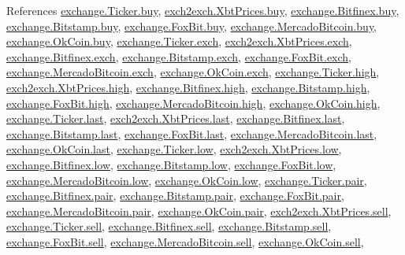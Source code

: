 References \hyperlink{exchange_8py_source_l00058}{exchange.\+Ticker.\+buy}, \hyperlink{exch2exch_8py_source_l00059}{exch2exch.\+Xbt\+Prices.\+buy}, \hyperlink{exchange_8py_source_l00323}{exchange.\+Bitfinex.\+buy}, \hyperlink{exchange_8py_source_l00392}{exchange.\+Bitstamp.\+buy}, \hyperlink{exchange_8py_source_l00464}{exchange.\+Fox\+Bit.\+buy}, \hyperlink{exchange_8py_source_l00526}{exchange.\+Mercado\+Bitcoin.\+buy}, \hyperlink{exchange_8py_source_l00591}{exchange.\+Ok\+Coin.\+buy}, \hyperlink{exchange_8py_source_l00055}{exchange.\+Ticker.\+exch}, \hyperlink{exch2exch_8py_source_l00064}{exch2exch.\+Xbt\+Prices.\+exch}, \hyperlink{exchange_8py_source_l00317}{exchange.\+Bitfinex.\+exch}, \hyperlink{exchange_8py_source_l00389}{exchange.\+Bitstamp.\+exch}, \hyperlink{exchange_8py_source_l00457}{exchange.\+Fox\+Bit.\+exch}, \hyperlink{exchange_8py_source_l00523}{exchange.\+Mercado\+Bitcoin.\+exch}, \hyperlink{exchange_8py_source_l00588}{exchange.\+Ok\+Coin.\+exch}, \hyperlink{exchange_8py_source_l00060}{exchange.\+Ticker.\+high}, \hyperlink{exch2exch_8py_source_l00061}{exch2exch.\+Xbt\+Prices.\+high}, \hyperlink{exchange_8py_source_l00325}{exchange.\+Bitfinex.\+high}, \hyperlink{exchange_8py_source_l00394}{exchange.\+Bitstamp.\+high}, \hyperlink{exchange_8py_source_l00466}{exchange.\+Fox\+Bit.\+high}, \hyperlink{exchange_8py_source_l00528}{exchange.\+Mercado\+Bitcoin.\+high}, \hyperlink{exchange_8py_source_l00593}{exchange.\+Ok\+Coin.\+high}, \hyperlink{exchange_8py_source_l00062}{exchange.\+Ticker.\+last}, \hyperlink{exch2exch_8py_source_l00063}{exch2exch.\+Xbt\+Prices.\+last}, \hyperlink{exchange_8py_source_l00327}{exchange.\+Bitfinex.\+last}, \hyperlink{exchange_8py_source_l00396}{exchange.\+Bitstamp.\+last}, \hyperlink{exchange_8py_source_l00468}{exchange.\+Fox\+Bit.\+last}, \hyperlink{exchange_8py_source_l00530}{exchange.\+Mercado\+Bitcoin.\+last}, \hyperlink{exchange_8py_source_l00595}{exchange.\+Ok\+Coin.\+last}, \hyperlink{exchange_8py_source_l00061}{exchange.\+Ticker.\+low}, \hyperlink{exch2exch_8py_source_l00062}{exch2exch.\+Xbt\+Prices.\+low}, \hyperlink{exchange_8py_source_l00326}{exchange.\+Bitfinex.\+low}, \hyperlink{exchange_8py_source_l00395}{exchange.\+Bitstamp.\+low}, \hyperlink{exchange_8py_source_l00467}{exchange.\+Fox\+Bit.\+low}, \hyperlink{exchange_8py_source_l00529}{exchange.\+Mercado\+Bitcoin.\+low}, \hyperlink{exchange_8py_source_l00594}{exchange.\+Ok\+Coin.\+low}, \hyperlink{exchange_8py_source_l00056}{exchange.\+Ticker.\+pair}, \hyperlink{exchange_8py_source_l00318}{exchange.\+Bitfinex.\+pair}, \hyperlink{exchange_8py_source_l00390}{exchange.\+Bitstamp.\+pair}, \hyperlink{exchange_8py_source_l00458}{exchange.\+Fox\+Bit.\+pair}, \hyperlink{exchange_8py_source_l00524}{exchange.\+Mercado\+Bitcoin.\+pair}, \hyperlink{exchange_8py_source_l00589}{exchange.\+Ok\+Coin.\+pair}, \hyperlink{exch2exch_8py_source_l00058}{exch2exch.\+Xbt\+Prices.\+sell}, \hyperlink{exchange_8py_source_l00059}{exchange.\+Ticker.\+sell}, \hyperlink{exchange_8py_source_l00324}{exchange.\+Bitfinex.\+sell}, \hyperlink{exchange_8py_source_l00393}{exchange.\+Bitstamp.\+sell}, \hyperlink{exchange_8py_source_l00465}{exchange.\+Fox\+Bit.\+sell}, \hyperlink{exchange_8py_source_l00527}{exchange.\+Mercado\+Bitcoin.\+sell}, \hyperlink{exchange_8py_source_l00592}{exchange.\+Ok\+Coin.\+sell}, 